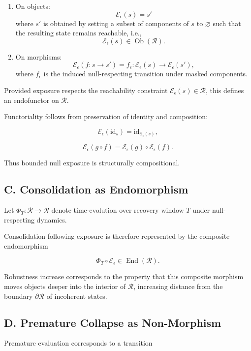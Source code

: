 \documentclass[11pt]{article}
\theoremstyle{remark}
\begin{document}
\begin{enumerate}
\item On objects:
\[
\mathcal{E}_\epsilon(s)
=
s'
\]
where $s'$ is obtained by setting a subset of components of $s$ to $\varnothing$ such that the resulting state remains reachable, i.e.,
\[
\mathcal{E}_\epsilon(s) \in \operatorname{Ob}(\mathcal{R}).
\]

\item On morphisms:
\[
\mathcal{E}_\epsilon(f : s \to s')
=
f_\epsilon : \mathcal{E}_\epsilon(s) \to \mathcal{E}_\epsilon(s'),
\]
where $f_\epsilon$ is the induced null-respecting transition under masked components.
\end{enumerate}

Provided exposure respects the reachability constraint 
$\mathcal{E}_\epsilon(s) \in \mathcal{R}$, this defines an endofunctor on $\mathcal{R}$.

Functoriality follows from preservation of identity and composition:

\[
\mathcal{E}_\epsilon(\mathrm{id}_s)
=
\mathrm{id}_{\mathcal{E}_\epsilon(s)},
\]

\[
\mathcal{E}_\epsilon(g \circ f)
=
\mathcal{E}_\epsilon(g) \circ \mathcal{E}_\epsilon(f).
\]

Thus bounded null exposure is structurally compositional.

\subsection*{C. Consolidation as Endomorphism}

Let $\Phi_T : \mathcal{R} \to \mathcal{R}$ denote time-evolution over recovery window $T$ under null-respecting dynamics.

Consolidation following exposure is therefore represented by the composite endomorphism

\[
\Phi_T \circ \mathcal{E}_\epsilon \in \operatorname{End}(\mathcal{R}).
\]

Robustness increase corresponds to the property that this composite morphism moves objects deeper into the interior of $\mathcal{R}$, increasing distance from the boundary $\partial \mathcal{R}$ of incoherent states.

\subsection*{D. Premature Collapse as Non-Morphism}

Premature evaluation corresponds to a transition
\end{document}

